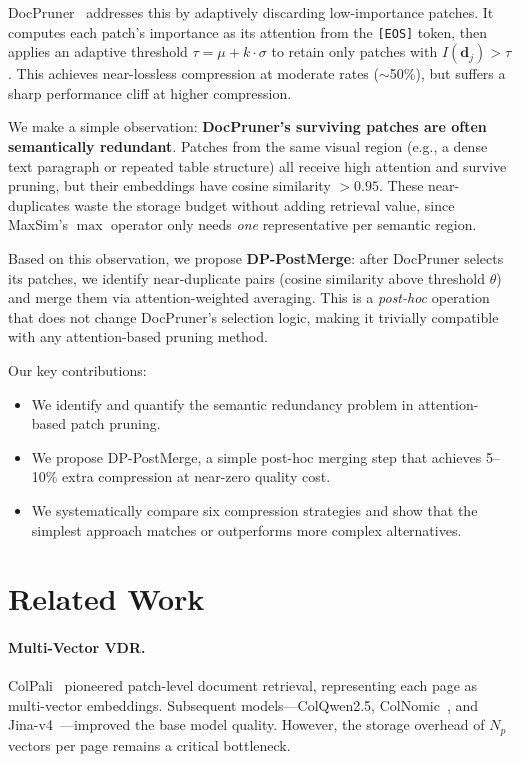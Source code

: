 \documentclass[11pt]{article}
\begin{document}
DocPruner~\cite{yan2025docpruner} addresses this by adaptively discarding low-importance patches.
It computes each patch's importance as its attention from the \texttt{[EOS]} token, then applies an adaptive threshold $\tau = \mu + k \cdot \sigma$ to retain only patches with $I(\mathbf{d}_j) > \tau$.
This achieves near-lossless compression at moderate rates ($\sim$50\%), but suffers a sharp performance cliff at higher compression.

We make a simple observation: \textbf{DocPruner's surviving patches are often semantically redundant}.
Patches from the same visual region (e.g., a dense text paragraph or repeated table structure) all receive high attention and survive pruning, but their embeddings have cosine similarity $>0.95$.
These near-duplicates waste the storage budget without adding retrieval value, since MaxSim's $\max$ operator only needs \emph{one} representative per semantic region.

Based on this observation, we propose \textbf{DP-PostMerge}: after DocPruner selects its patches, we identify near-duplicate pairs (cosine similarity above threshold $\theta$) and merge them via attention-weighted averaging.
This is a \emph{post-hoc} operation that does not change DocPruner's selection logic, making it trivially compatible with any attention-based pruning method.

Our key contributions:
\begin{itemize}
\item We identify and quantify the semantic redundancy problem in attention-based patch pruning.
\item We propose DP-PostMerge, a simple post-hoc merging step that achieves 5--10\% extra compression at near-zero quality cost.
\item We systematically compare six compression strategies and show that the simplest approach matches or outperforms more complex alternatives.
\end{itemize}


\section{Related Work}

\paragraph{Multi-Vector VDR.}
ColPali~\cite{faysse2024colpali} pioneered patch-level document retrieval, representing each page as multi-vector embeddings.
Subsequent models---ColQwen2.5, ColNomic~\cite{nomicai2025}, and Jina-v4~\cite{gunther2025jina}---improved the base model quality.
However, the storage overhead of $N_p$ vectors per page remains a critical bottleneck.
\end{document}
